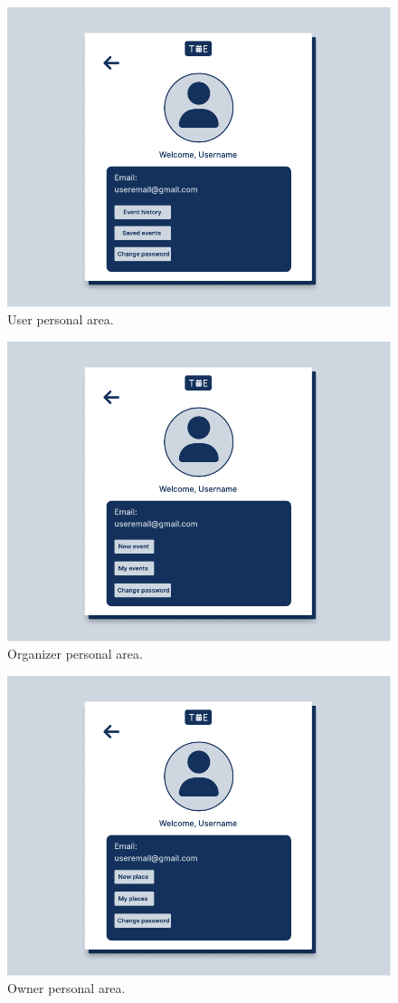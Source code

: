 \documentclass[9pt]{extarticle}
\begin{document}
\begin{figure}[!htb]
	\centering
	\includegraphics[width=.7\linewidth]{./images/UserPersonalArea.pdf}
	\caption{User personal area.}
	\label{fig:userPersonalArea}
\end{figure}

\begin{figure}[!htb]
	\centering
	\includegraphics[width=.7\linewidth]{./images/OrganizerPersonalArea.pdf}
	\caption{Organizer personal area.}
	\label{fig:organizerPersonalArea}
\end{figure}
\newpage

\begin{figure}[!htb]
	\centering
	\includegraphics[width=.7\linewidth]{./images/OwnerPersonalArea.pdf}
	\caption{Owner personal area.}
	\label{fig:ownerPersonalArea}
\end{figure}
\end{document}
